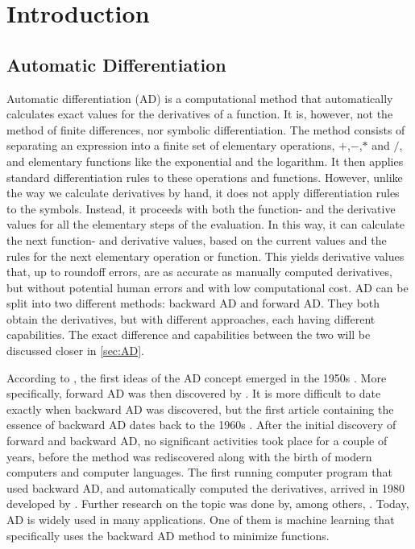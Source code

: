 \chapter{Introduction}
\section{Automatic Differentiation}
Automatic differentiation (AD) is a computational method that automatically calculates exact values for the derivatives of a function. It is, however, not the method of finite differences, nor symbolic differentiation. The method consists of separating an expression into a finite set of elementary operations, $+$,$-$,$*$ and $/$, and elementary functions like the exponential and the logarithm. It then applies standard differentiation rules to these operations and functions. However, unlike the way we calculate derivatives by hand, it does not apply differentiation rules to the symbols. Instead, it proceeds with both the function- and the derivative values for all the elementary steps of the evaluation. In this way, it can calculate the next function- and derivative values, based on the current values and the rules for the next elementary operation or function. This yields derivative values that, up to roundoff errors, are as accurate as manually computed derivatives, but without potential human errors and with low computational cost. AD can be split into two different methods: backward AD and forward AD. They both obtain the derivatives, but with different approaches, each having different capabilities. The exact difference and capabilities between the two will be discussed closer in \autoref{sec:AD}. 

According to \emph{\cite{SurveyAD}}, the first ideas of the AD concept emerged in the 1950s \emph{\citep{nolan1953analytical, beda1959programs}}. More specifically, forward AD was then discovered by \emph{\citet{wengert1964simple}}. It is more difficult to date exactly when backward AD was discovered, but the first article containing the essence of backward AD dates back to the 1960s \emph{\citep{boltyanskii1960theory}}. After the initial discovery of forward and backward AD, no significant activities took place for a couple of years, before the method was rediscovered along with the birth of modern computers and computer languages. The first running computer program that used backward AD, and automatically computed the derivatives, arrived in 1980 developed by \emph{\citet{speelpenning1980compiling}}. Further research on the topic was done by, among others, \emph{\citet{griewank1989automatic}}. Today, AD is widely used in many applications. One of them is machine learning that specifically uses the backward AD method to minimize functions. 

